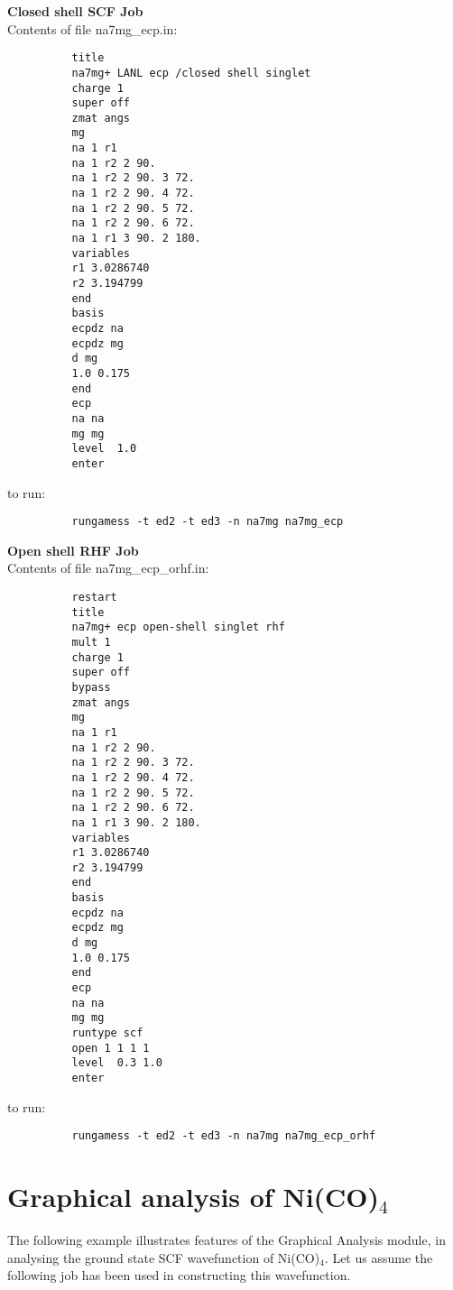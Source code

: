 \documentclass[11pt,fleqn]{article}
\newcommand{\nico}{\mbox{Ni(CO)$_{4}$}}
\begin{document}
{\bf Closed shell SCF Job}\\

Contents of file na7mg\_ecp.in:
{
\footnotesize
\begin{verbatim}
          title
          na7mg+ LANL ecp /closed shell singlet
          charge 1
          super off
          zmat angs
          mg
          na 1 r1 
          na 1 r2 2 90.
          na 1 r2 2 90. 3 72.
          na 1 r2 2 90. 4 72.
          na 1 r2 2 90. 5 72.
          na 1 r2 2 90. 6 72.
          na 1 r1 3 90. 2 180.
          variables
          r1 3.0286740
          r2 3.194799
          end
          basis 
          ecpdz na 
          ecpdz mg
          d mg
          1.0 0.175
          end
          ecp
          na na
          mg mg
          level  1.0
          enter
\end{verbatim}
}
to run:
{
\footnotesize
\begin{verbatim}
          rungamess -t ed2 -t ed3 -n na7mg na7mg_ecp
\end{verbatim}
}
{\bf Open shell RHF Job}\\

Contents of file na7mg\_ecp\_orhf.in:
{
\footnotesize
\begin{verbatim}
          restart
          title
          na7mg+ ecp open-shell singlet rhf
          mult 1
          charge 1
          super off
          bypass
          zmat angs
          mg
          na 1 r1 
          na 1 r2 2 90.
          na 1 r2 2 90. 3 72.
          na 1 r2 2 90. 4 72.
          na 1 r2 2 90. 5 72.
          na 1 r2 2 90. 6 72.
          na 1 r1 3 90. 2 180.
          variables
          r1 3.0286740
          r2 3.194799
          end
          basis 
          ecpdz na 
          ecpdz mg
          d mg
          1.0 0.175
          end
          ecp
          na na
          mg mg
          runtype scf
          open 1 1 1 1
          level  0.3 1.0
          enter
\end{verbatim}
}
to run:
{
\footnotesize
\begin{verbatim}
          rungamess -t ed2 -t ed3 -n na7mg na7mg_ecp_orhf
\end{verbatim}
}
\section[Graphical analysis of \nico]{Graphical analysis of \nico}
 
The following  example illustrates   features of the  Graphical
Analysis module, in analysing the ground state SCF
wavefunction of \nico. Let us assume the following job
has been used in constructing this wavefunction.
\end{document}
